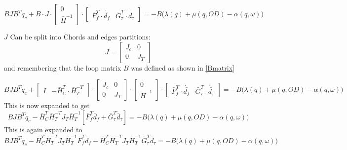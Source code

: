 \begin{equation}
BJB^T \dot{q}_c +B\cdot J\cdot \begin{bmatrix} 
	0\\ 
	\bar{H}^{-1}
\end{bmatrix}
\cdot \begin{bmatrix}
	\bar{F}_{f}^{T}\cdot \dot{\bar{d_{f}}} & \bar{G}_{\tau}^{T}\cdot \dot{\bar{d_{\tau}}}\end{bmatrix}
 = -B \Big(\lambda(q)+\mu(q,OD) - \alpha(q,\omega)\Big)
\end{equation}

$J$ Can be split into Chords and edges partitions:
\begin{equation*}
	J = \begin{bmatrix}
		J_c & 0\\
		0 & J_T
	\end{bmatrix}
\end{equation*} 
and remembering that the loop matrix $B$ was defined as shown in \cref{Bmatrix}

\begin{equation*}
	BJB^T \dot{q}_c + \begin{bmatrix}
		I & -\bar{H}_{C}^{T}\cdot\bar{H}_{T}^{-T}
	\end{bmatrix}\cdot \begin{bmatrix}
		J_c & 0\\
		0 & J_T
	\end{bmatrix}\cdot \begin{bmatrix} 
		0\\ 
		\bar{H}^{-1}
	\end{bmatrix}
	\cdot \begin{bmatrix}
		\bar{F}_{f}^{T}\cdot \dot{\bar{d_{f}}} & \bar{G}_{\tau}^{T}\cdot \dot{\bar{d_{\tau}}}\end{bmatrix}
	= -B \Big(\lambda(q)+\mu(q,OD) - \alpha(q,\omega)\Big)
\end{equation*}
This is now expanded to get
\begin{equation}
		BJB^T \dot{q}_c - \bar{H}_C^T \bar{H}_T^{-T}J_T\bar{H}_T^{-1}[\bar{F}_f^T\dot{\bar{d}}_f+\bar{G}_\tau^T\dot{\bar{d}}_\tau]
	= -B \Big(\lambda(q)+\mu(q,OD) - \alpha(q,\omega)\Big)
\end{equation}
This is again expanded to
\begin{equation}
	BJB^T \dot{q}_c - \bar{H}_C^T \bar{H}_T^{-T}J_T\bar{H}_T^{-1}\bar{F}_f^T\dot{\bar{d}}_f-\bar{H}_C^T \bar{H}_T^{-T}J_T\bar{H}_T^{-1}\bar{G}_\tau^T\dot{\bar{d}}_\tau
	= -B \Big(\lambda(q)+\mu(q,OD) - \alpha(q,\omega)\Big)
\end{equation}



